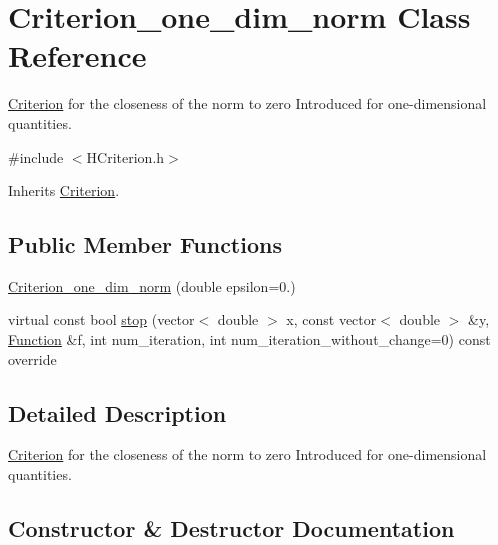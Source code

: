 \hypertarget{class_criterion__one__dim__norm}{}\section{Criterion\+\_\+one\+\_\+dim\+\_\+norm Class Reference}
\label{class_criterion__one__dim__norm}


\hyperlink{class_criterion}{Criterion} for the closeness of the norm to zero Introduced for one-\/dimensional quantities.  




{\ttfamily \#include $<$H\+Criterion.\+h$>$}



Inherits \hyperlink{class_criterion}{Criterion}.

\subsection*{Public Member Functions}
\begin{DoxyCompactItemize}
\item 
\hyperlink{class_criterion__one__dim__norm_aff2ffa66db6d9e5e1978a44a1f8ef6a8}{Criterion\+\_\+one\+\_\+dim\+\_\+norm} (double epsilon=0.)
\item 
virtual const bool \hyperlink{class_criterion__one__dim__norm_a7270d8ca17d8f810b4a270ad604be8bd}{stop} (vector$<$ double $>$ x, const vector$<$ double $>$ \&y, \hyperlink{class_function}{Function} \&f, int num\+\_\+iteration, int num\+\_\+iteration\+\_\+without\+\_\+change=0) const override
\end{DoxyCompactItemize}


\subsection{Detailed Description}
\hyperlink{class_criterion}{Criterion} for the closeness of the norm to zero Introduced for one-\/dimensional quantities. 

\subsection{Constructor \& Destructor Documentation}
\mbox{\label{class_criterion__one__dim__norm_aff2ffa66db6d9e5e1978a44a1f8ef6a8}} 
